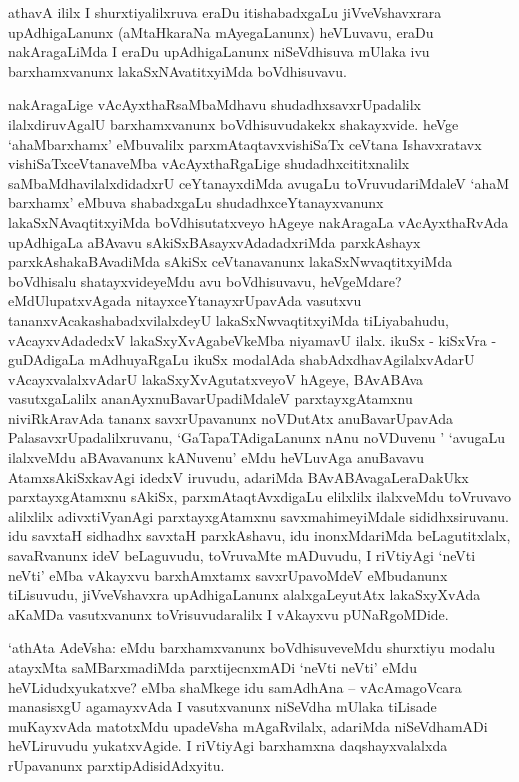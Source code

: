 \begin{artha}
athavA ililx I shurxtiyalilxruva eraDu itishabadxgaLu jiVveVshavxrara
upAdhi\-gaLanunx (aMtaHkaraNa mAyegaLanunx) heVLuvavu, eraDu
nakAragaLiMda I eraDu upAdhigaLanunx niSeVdhisuva mUlaka ivu
barxhamxvanunx lakaSxNAvatitxyiMda boVdhisuvavu.

nakAragaLige vAcAyxthaRsaMbaMdhavu shudadhxsavxrUpadalilx
ilalxdiruvAgalU barxhamx\-vanunx boVdhisuvudakekx shakayxvide. heVge
`ahaMbarxhamx' eMbuvalilx parxmAtaqtavxvishiSaTx ceVtana Ishavxratavx
vishiSaTxceVtanaveMba vAcAyxthaRgaLige shudadhxcititxnalilx
saMbaMdhavilalxdidadx\-rU ceYtanayxdiMda avugaLu toVruvudariMdaleV `ahaM
barxhamx' eMbuva shabadxgaLu shudadhxceYtanayxvanunx
lakaSxNAvaqtitxyiMda boVdhisutatxveyo hAgeye nakAragaLa vAcAyxthaR\-vAda
upAdhigaLa aBAvavu sAkiSxBAsayxvAdadadxriMda parxkAshayx
parxkAshakaBAvadiMda sAkiSx ceVtanavanunx lakaSxNwvaqtitxyiMda
boVdhisalu shatayxvideyeMdu avu boVdhi\-suvavu, heVgeMdare?
eMdUlupatxvAgada nitayxceYtanayxrUpavAda vasutxvu
tananxvAcaka\-shabadxvilalxdeyU lakaSxNwvaqtitxyiMda tiLiyabahudu,
vAcayxvAdadedxV lakaSxyXvAgabeV\-keMba niyamavU ilalx. ikuSx - kiSxVra -
guDAdigaLa mAdhuyaRgaLu ikuSx modalAda shabAdxdhavAgilalxvAdarU vAcayxvalalxvAdarU lakaSxyXvAgutatxveyoV hAgeye, \-BAvABAva
vasutxgaLalilx ananAyxnuBavarUpadiMdaleV parxtayxgAtamxnu
niviRkAravAda tananx savxrUpavanunx noVDutAtx anuBavarUpavAda
PalasavxrUpadalilxruvanu, `GaTapaTAdigaLanunx nAnu noVDuvenu '
`avugaLu ilalxveMdu aBAvavanunx kANu\-venu' eMdu heVLuvAga anuBavavu
AtamxsAkiSxkavAgi idedxV iruvudu, adariMda \-BAvABAvagaLeraDakUkx
parxtayxgAtamxnu sAkiSx, parxmAtaqtAvxdigaLu elilxlilx ilalxveMdu
\-toVruvavo alilxlilx adivxtiVyanAgi parxtayxgAtamxnu savxmahimeyiMdale
sididhxsiru\-vanu. idu savxtaH sidhadhx savxtaH parxkAshavu, idu
inonxMdariMda beLagutitxlalx, savaRvanunx ideV beLaguvudu, toVruvaMte
mADuvudu, I riVtiyAgi `neVti neVti' eMba vAkayxvu barxhAmxtamx
savxrUpavoMdeV eMbudanunx tiLisuvudu, jiVveVshavxra upAdhigaLanunx
alalxgaLeyutAtx lakaSxyXvAda aKaMDa vasutxvanunx toVrisuvudaralilx I
vAkayxvu pUNaR\-goMDide.

`athAta AdeVsha: eMdu barxhamxvanunx boVdhisuveveMdu shurxtiyu modalu
atayxMta saMBarxmadiMda parxtijecnxmADi `neVti neVti' eMdu heVLidudxyukatxve? eMba shaMkege
idu samAdhAna -- vAcAmagoVcara manasisxgU agamayxvAda I vasutxvanunx
niSeVdha mUlaka tiLisade muKayxvAda matotxMdu upadeVsha mAgaRvilalx,
adariMda niSeVdhamADi heVLiruvudu yukatxvAgide. I riVtiyAgi barxhamxna
daqshayxvalalxda rUpavanunx parxtipAdisidAdxyitu.
\end{artha}

